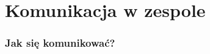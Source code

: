 \section{Komunikacja w zespole}
\label{komunikacja}


\begin{frame}
    \frametitle{Jak się komunikować?}

    

\end{frame}